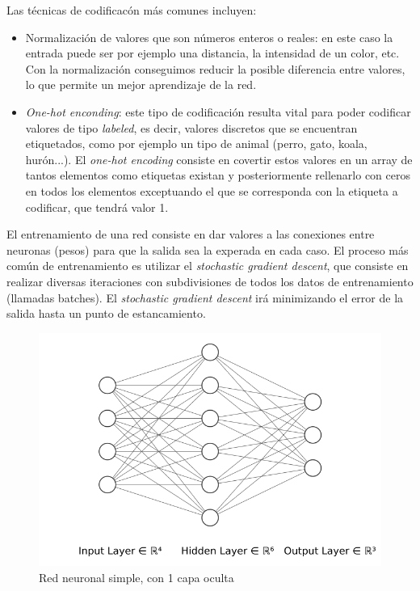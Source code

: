     Las técnicas de codificacón más comunes incluyen: 
    \begin{itemize}
        \item Normalización de valores que son números enteros o reales: en este caso la entrada puede ser por ejemplo una distancia, la intensidad de un color, etc. Con la normalización conseguimos reducir la posible diferencia entre valores, lo que permite un mejor aprendizaje de la red.
        \item \textit{One-hot enconding}: este tipo de codificación resulta vital para poder codificar valores de tipo \textit{labeled}, es decir, valores discretos que se encuentran etiquetados, como por ejemplo un tipo de animal (perro, gato, koala, hurón...). El \textit{one-hot encoding} consiste en covertir estos valores en un array de tantos elementos como etiquetas existan y posteriormente rellenarlo con ceros en todos los elementos exceptuando el que se corresponda con la etiqueta a codificar, que tendrá valor 1.
    \end{itemize}

    El entrenamiento de una red consiste en dar valores a las conexiones entre neuronas (pesos) para que la salida sea la experada en cada caso. El proceso más común de entrenamiento es utilizar el \textit{stochastic gradient descent}, que consiste en realizar diversas iteraciones con subdivisiones de todos los datos de entrenamiento (llamadas batches). El \textit{stochastic gradient descent} irá minimizando el error de la salida hasta un punto de estancamiento.

    \begin{figure}
        \centering
        \includegraphics[width=1\textwidth]{Imagenes/Bitmap/nn.png}
        \caption{Red neuronal simple, con 1 capa oculta}
        \label{fig:simpleNN}
    \end{figure}

